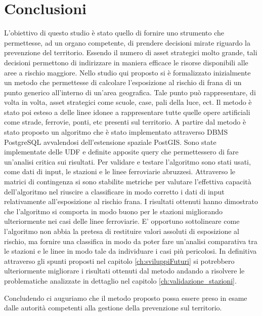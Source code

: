 
\chapter{Conclusioni} 
L'obiettivo di questo studio è stato quello di fornire uno strumento che permettesse, ad un organo competente, di prendere decisioni mirate riguardo la prevenzione del territorio.
Essendo il numero di asset strategici molto grande, tali decisioni permettono di indirizzare in maniera efficace le risorse disponibili alle aree a rischio maggiore. Nello studio qui proposto si è formalizzato inizialmente un metodo che permettesse di calcolare l'esposizione al rischio di frana di un punto generico all'interno di un'area geografica. Tale punto può rappresentare, di volta in volta, asset strategici come scuole, case, pali della luce, ect. Il metodo è stato poi esteso a delle linee idonee a rappresentare tutte quelle opere artificiali come strade, ferrovie, ponti, etc presenti sul territorio. 
\newline
 A partire dal metodo è stato proposto un algoritmo che è stato implementato attraverso DBMS PostgreSQL avvalendosi dell’estensione spaziale PostGIS. Sono state implementate delle UDF e definite apposite query che permettessero di fare un'analisi critica sui risultati.
\newline Per validare e testare l'algoritmo sono stati usati, come dati di input, le stazioni e le linee ferroviarie abruzzesi. Attraverso le matrici di contingenza si sono stabilite metriche per valutare l'effettiva capacità dell'algoritmo nel riuscire a classificare in modo corretto i dati di input relativamente all'esposizione al rischio frana. I risultati ottenuti hanno dimostrato che l'algoritmo si comporta in modo buono per le stazioni migliorando ulteriormente nei casi delle linee ferroviarie. \newline
 E' opportuno sottolineare come l'algoritmo non abbia la pretesa di restituire valori assoluti di esposizione al rischio, ma fornire una classifica in modo da poter fare un'analisi comparativa tra le stazioni e le linee in modo tale da individuare i casi più pericolosi. In definitiva attraverso gli spunti proposti nel capitolo \ref{ch:sviluppiFuturi} si potrebbero ulteriormente migliorare i risultati ottenuti dal metodo andando a risolvere le problematiche analizzate in dettaglio nel capitolo \ref{ch:validazione_stazioni}.

Concludendo ci auguriamo che il metodo proposto possa essere preso in esame dalle autorità competenti alla gestione della prevenzione sul territorio.